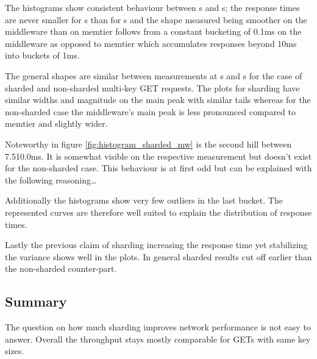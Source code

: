         The histograms show consistent behaviour between \srv{}s and \mw{}s; the response times are never smaller for
        \srv{}s than for \mw{}s and the shape measured being smoother on the middleware than on memtier follows from
        a constant bucketing of 0.1ms on the middleware as opposed to memtier which accumulates responses beyond 10ms
        into buckets of 1ms.

        The general shapes are similar between measurements at \mw{}s and \cli{}s for the case of sharded and
        non-sharded multi-key GET requests. The plots for sharding have similar widths and magnitude on the main peak with
        similar tails whereas for the non-sharded case the middleware's main peak is less pronounced compared to memtier
        and slightly wider.

        Noteworthy in figure \ref{fig:histogram_sharded_mw} is the second hill between 7.5\textendash10.0ms. It is
        somewhat visible on the respective \srv{} measurement but doesn't exist for the non-sharded case. This behaviour
        is at first odd but can be explained with the following reasoning\dots


        Additionally the histograms show very few outliers in the last bucket. The represented curves are therefore well
        suited to explain the distribution of response times.

        Lastly the previous claim of sharding increasing the response time yet stabilizing the variance shows well in
        the plots. In general sharded results cut off earlier than the non-sharded counter-part.

    \subsection{Summary\label{subsec:5_summary}}

        The question on how much sharding improves network performance is not easy to answer. Overall the throughput
        stays mostly comparable for GETs with same key sizes.%

